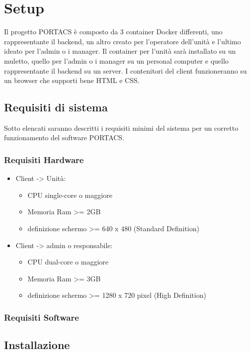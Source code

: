 \section{Setup}
Il progetto PORTACS è composto da 3 container Docker differenti, uno rappresentante il backend, un altro creato per l'operatore dell'unità e l'ultimo ideato per l'admin o i manager. Il container per l'unità sarà installato su un muletto, quello per l'admin o i manager su un personal computer e quello rappresentante il backend su un server. I contenitori del client funzioneranno su un browser che supporti bene HTML e CSS.


\subsection{Requisiti di sistema}
Sotto elencati saranno descritti i requisiti minimi del sistema per un corretto funzionamento del software PORTACS.


\subsubsection{Requisiti Hardware}
\begin{itemize}
	\item Client -> Unità:
\begin{itemize}
	\item CPU single-core o maggiore
	\item Memoria Ram >= 2GB
	\item definizione schermo >= 640 x 480 (Standard Definition)
\end{itemize}
	\item Client -> admin o responsabile:
\begin{itemize}
	\item CPU dual-core o maggiore
	\item Memoria Ram >= 3GB
	\item definizione schermo >= 1280 x 720 pixel (High Definition)
\end{itemize}
\end{itemize}

\subsubsection{Requisiti Software}







\subsection{Installazione}




